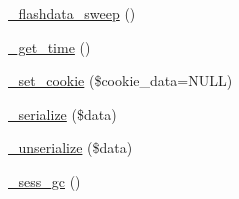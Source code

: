\begin{DoxyCompactItemize}
\hyperlink{class_c_i___session_a4f5465cfc2f0dae836bfcc489d96d33e}{\-\_\-flashdata\-\_\-sweep} ()
\item 
\hyperlink{class_c_i___session_a8593101bdc7969d31743d6d432dad908}{\-\_\-get\-\_\-time} ()
\item 
\hyperlink{class_c_i___session_a28a4132f8380d6426f83c0aaeaa3c3f0}{\-\_\-set\-\_\-cookie} (\$cookie\-\_\-data=N\-U\-L\-L)
\item 
\hyperlink{class_c_i___session_a0adebf4d7ba21c19cba8c90e8319bf3a}{\-\_\-serialize} (\$data)
\item 
\hyperlink{class_c_i___session_ae7f6b0450269815736585abc087fee7b}{\-\_\-unserialize} (\$data)
\item 
\hyperlink{class_c_i___session_acda34aabaf23a1a90ef8cc1711a92078}{\-\_\-sess\-\_\-gc} ()
\end{DoxyCompactItemize}
